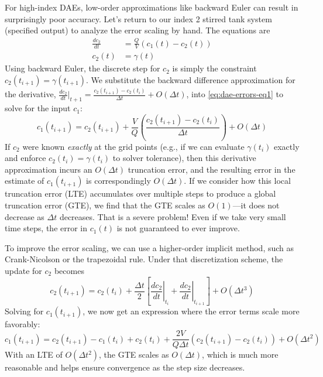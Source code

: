 For high-index DAEs,  low-order approximations like backward Euler can result in surprisingly poor accuracy. Let's return to our index 2 stirred tank system (specified output) to analyze the error scaling by hand. The equations are
\begin{align}
    \frac{dc_2}{dt} &= \frac{Q}{V}(c_1(t) - c_2(t)) \label{eq:dae-errors-eq1}\\
    c_2(t) &= \gamma(t)
\end{align}
Using backward Euler, the discrete step for $c_2$ is simply the constraint $c_2(t_{i+1}) = \gamma(t_{i+1})$. We substitute the backward difference approximation for the derivative, $\frac{dc_2}{dt}\big|_{t+1} = \frac{c_2(t_{i+1}) - c_2(t_i)}{\Delta t} + O(\Delta t)$, into \autoref{eq:dae-errors-eq1} to solve for the input $c_1$:
\begin{equation}
    c_1(t_{i+1}) = c_2(t_{i+1}) + \frac{V}{Q} \left( \frac{c_2(t_{i+1}) - c_2(t_i)}{\Delta t} \right) + O(\Delta t)
\end{equation}
If $c_2$ were known \emph{exactly} at the grid points (e.g., if we can evaluate $\gamma(t_i)$ exactly and enforce $c_2(t_i)=\gamma(t_i)$ to solver tolerance), then this derivative approximation incurs an $O(\Delta t)$ truncation error, and the resulting error in the estimate of $c_1(t_{i+1})$ is correspondingly $O(\Delta t)$. If we consider how this local truncation error (LTE) accumulates over multiple steps to produce a global truncation error (GTE), we find that the GTE scales as $O(1)$---it does not decrease as $\Delta t$ decreases. That is a severe problem! Even if we take very small time steps, the error in $c_1(t)$ is not guaranteed to ever improve.


To improve the error scaling, we can use a higher-order implicit method, such as Crank-Nicolson or the trapezoidal rule. Under that discretization scheme, the update for $c_2$ becomes
\begin{equation}
    c_2(t_{i+1}) = c_2(t_i) + \frac{\Delta t}{2} \left[ \left.\frac{dc_2}{dt}\right|_{t_i} + \left.\frac{dc_2}{dt}\right|_{t_{i+1}} \right] + O(\Delta t^3)
\end{equation}
Solving for $c_1(t_{i+1})$, we now get an expression where the error terms scale more favorably:
\begin{equation}
    c_1(t_{i+1}) = c_2(t_{i+1}) - c_1(t_i) + c_2(t_i) + \frac{2V}{Q\Delta t}(c_2(t_{i+1}) - c_2(t_i)) + O(\Delta t^2)
\end{equation}
With an LTE of $O(\Delta t^2)$, the GTE scales as $O(\Delta t)$, which is much more reasonable and helps ensure convergence as the step size decreases.

